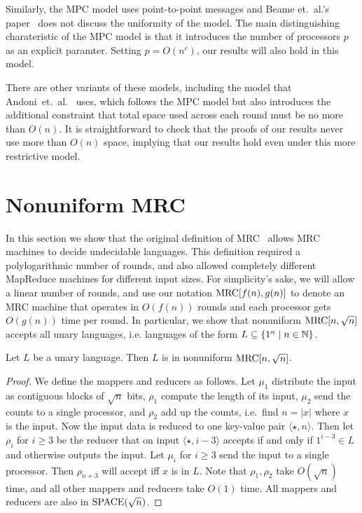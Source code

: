 Similarly, the MPC model uses point-to-point messages and Beame et.~al.'s
paper~\cite{BeameKS13} does not discuss the uniformity of the model.  The main
distinguishing charateristic of the MPC model is that it introduces the number
of processors $p$ as an explicit paramter.  Setting $p=O(n^c)$, our results
will also hold in this model.

There are other variants of these models, including the model that
Andoni~et.~al.~\cite{AndoniNOY14} uses, which follows the MPC model but also
introduces the additional constraint that total space used across each round
must be no more than $O(n)$.  It is straightforward to check that the proofs of
our results never use more than $O(n)$ space, implying that our results hold
even under this more restrictive model.

\section{Nonuniform MRC} \label{sec:nonuniformmrc}

In this section we show that the original definition of MRC~\cite{Karloff10}
allows MRC machines to decide undecidable languages.  This definition required
a polylogarithmic number of rounds, and also allowed completely different
MapReduce machines for different input sizes.  For simplicity's sake, we will
allow a linear number of rounds, and use our notation $\textup{MRC}[f(n), g(n)]$ to
denote an MRC machine that operates in $O(f(n))$ rounds and each processor gets
$O(g(n))$ time per round.  In particular, we show that nonuniform $\textup{MRC}[n,
\sqrt{n}]$ accepts all unary languages, i.e. languages of the form $L \subseteq
\{1^n \mid n \in \mathbb{N}\}$.

\begin{lemma}\label{lemma:unary}
Let $L$ be a unary language. Then $L$ is in nonuniform $\textup{MRC}[n, \sqrt{n}]$.
\end{lemma}

\begin{proof}
We define the mappers and reducers as follows. Let $\mu_1$ distribute the input
as contiguous blocks of $\sqrt{n}$ bits, $\rho_1$ compute the length of its
input, $\mu_2$ send the counts to a single processor, and $\rho_2$ add up the
counts, i.e.\ find $n=|x|$ where $x$ is the input. Now the input data is
reduced to one key-value pair $\langle \star, n \rangle$. Then let $\rho_i$ for
$i \ge 3$ be the reducer that on input $\langle \star, i-3 \rangle$ accepts if
and only if $1^{i-3} \in L$ and otherwise outputs the input. Let $\mu_i$ for $i
\ge 3$ send the input to a single processor. Then $\rho_{n+3}$ will accept iff
$x$ is in $L$. Note that $\rho_1, \rho_2$ take $O(\sqrt{n})$ time, and all
other mappers and reducers take $O(1)$ time. All mappers and reducers are also
in $\textup{SPACE}(\sqrt{n})$. \end{proof}

